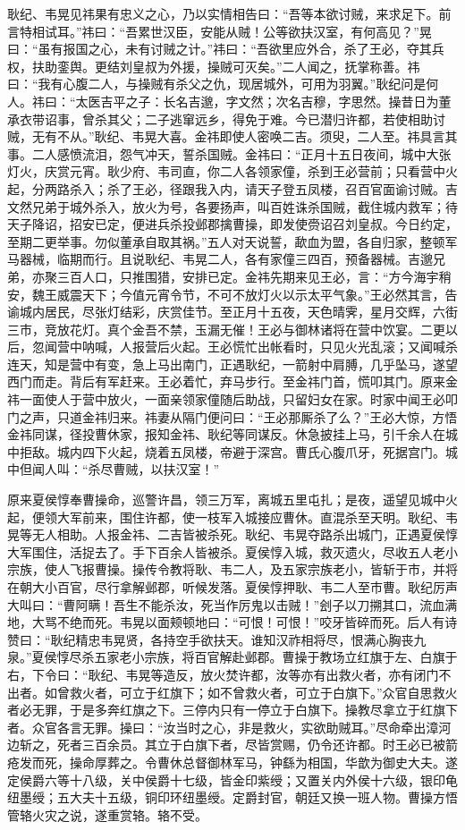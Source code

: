 耿纪、韦晃见祎果有忠义之心，乃以实情相告曰：“吾等本欲讨贼，来求足下。前言特相试耳。”祎曰：“吾累世汉臣，安能从贼！公等欲扶汉室，有何高见？”晃曰：“虽有报国之心，未有讨贼之计。”祎曰：“吾欲里应外合，杀了王必，夺其兵权，扶助銮舆。更结刘皇叔为外援，操贼可灭矣。”二人闻之，抚掌称善。祎曰：“我有心腹二人，与操贼有杀父之仇，现居城外，可用为羽翼。”耿纪问是何人。祎曰：“太医吉平之子：长名吉邈，字文然；次名吉穆，字思然。操昔日为董承衣带诏事，曾杀其父；二子逃窜远乡，得免于难。今已潜归许都，若使相助讨贼，无有不从。”耿纪、韦晃大喜。金祎即使人密唤二吉。须臾，二人至。祎具言其事。二人感愤流泪，怨气冲天，誓杀国贼。金祎曰：“正月十五日夜间，城中大张灯火，庆赏元宵。耿少府、韦司直，你二人各领家僮，杀到王必营前；只看营中火起，分两路杀入；杀了王必，径跟我入内，请天子登五凤楼，召百官面谕讨贼。吉文然兄弟于城外杀入，放火为号，各要扬声，叫百姓诛杀国贼，截住城内救军；待天子降诏，招安已定，便进兵杀投邺郡擒曹操，即发使赍诏召刘皇叔。今日约定，至期二更举事。勿似董承自取其祸。”五人对天说誓，歃血为盟，各自归家，整顿军马器械，临期而行。且说耿纪、韦晃二人，各有家僮三四百，预备器械。吉邈兄弟，亦聚三百人口，只推围猎，安排已定。金祎先期来见王必，言：“方今海宇稍安，魏王威震天下；今值元宵令节，不可不放灯火以示太平气象。”王必然其言，告谕城内居民，尽张灯结彩，庆赏佳节。至正月十五夜，天色晴霁，星月交辉，六街三市，竞放花灯。真个金吾不禁，玉漏无催！王必与御林诸将在营中饮宴。二更以后，忽闻营中呐喊，人报营后火起。王必慌忙出帐看时，只见火光乱滚；又闻喊杀连天，知是营中有变，急上马出南门，正遇耿纪，一箭射中肩膊，几乎坠马，遂望西门而走。背后有军赶来。王必着忙，弃马步行。至金祎门首，慌叩其门。原来金祎一面使人于营中放火，一面亲领家僮随后助战，只留妇女在家。时家中闻王必叩门之声，只道金祎归来。祎妻从隔门便问曰：“王必那厮杀了么？”王必大惊，方悟金祎同谋，径投曹休家，报知金祎、耿纪等同谋反。休急披挂上马，引千余人在城中拒敌。城内四下火起，烧着五凤楼，帝避于深宫。曹氏心腹爪牙，死据宫门。城中但闻人叫：“杀尽曹贼，以扶汉室！”

原来夏侯惇奉曹操命，巡警许昌，领三万军，离城五里屯扎；是夜，遥望见城中火起，便领大军前来，围住许都，使一枝军入城接应曹休。直混杀至天明。耿纪、韦晃等无人相助。人报金祎、二吉皆被杀死。耿纪、韦晃夺路杀出城门，正遇夏侯惇大军围住，活捉去了。手下百余人皆被杀。夏侯惇入城，救灭遗火，尽收五人老小宗族，使人飞报曹操。操传令教将耿、韦二人，及五家宗族老小，皆斩于市，并将在朝大小百官，尽行拿解邺郡，听候发落。夏侯惇押耿、韦二人至市曹。耿纪厉声大叫曰：“曹阿瞒！吾生不能杀汝，死当作厉鬼以击贼！”刽子以刀搠其口，流血满地，大骂不绝而死。韦晃以面颊顿地曰：“可恨！可恨！”咬牙皆碎而死。后人有诗赞曰：“耿纪精忠韦晃贤，各持空手欲扶天。谁知汉祚相将尽，恨满心胸丧九泉。”夏侯惇尽杀五家老小宗族，将百官解赴邺郡。曹操于教场立红旗于左、白旗于右，下令曰：“耿纪、韦晃等造反，放火焚许都，汝等亦有出救火者，亦有闭门不出者。如曾救火者，可立于红旗下；如不曾救火者，可立于白旗下。”众官自思救火者必无罪，于是多奔红旗之下。三停内只有一停立于白旗下。操教尽拿立于红旗下者。众官各言无罪。操曰：“汝当时之心，非是救火，实欲助贼耳。”尽命牵出漳河边斩之，死者三百余员。其立于白旗下者，尽皆赏赐，仍令还许都。时王必已被箭疮发而死，操命厚葬之。令曹休总督御林军马，钟繇为相国，华歆为御史大夫。遂定侯爵六等十八级，关中侯爵十七级，皆金印紫绶；又置关内外侯十六级，银印龟纽墨绶；五大夫十五级，铜印环纽墨绶。定爵封官，朝廷又换一班人物。曹操方悟管辂火灾之说，遂重赏辂。辂不受。

